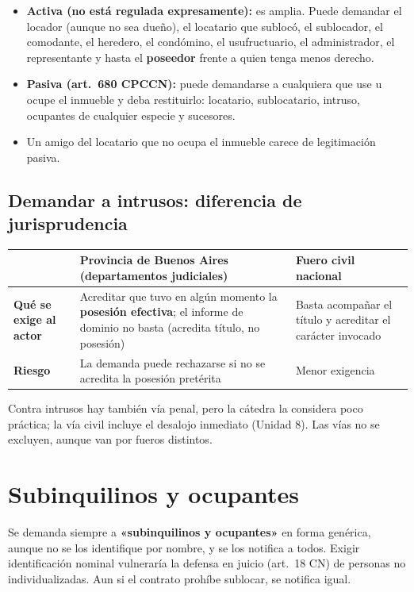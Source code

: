 \begin{itemize}
  \item \textbf{Activa (no está regulada expresamente):} es amplia. Puede demandar el locador (aunque no sea dueño), el locatario que sublocó, el sublocador, el comodante, el heredero, el condómino, el usufructuario, el administrador, el representante y hasta el \textbf{poseedor} frente a quien tenga menos derecho.
  \item \textbf{Pasiva (art.\ 680 CPCCN):} puede demandarse a cualquiera que use u ocupe el inmueble y deba restituirlo: locatario, sublocatario, intruso, ocupantes de cualquier especie y sucesores.
  \item Un amigo del locatario que no ocupa el inmueble carece de legitimación pasiva.
\end{itemize}

\subsection*{Demandar a intrusos: diferencia de jurisprudencia}

\begin{center}
\begin{tabularx}{\textwidth}{>{\raggedright\arraybackslash}p{2.6cm} Y Y}
\toprule
 & \textbf{Provincia de Buenos Aires (departamentos judiciales)} & \textbf{Fuero civil nacional} \\
\midrule
\textbf{Qué se exige al actor} & Acreditar que tuvo en algún momento la \textbf{posesión efectiva}; el informe de dominio no basta (acredita título, no posesión) & Basta acompañar el título y acreditar el carácter invocado \\
\addlinespace
\textbf{Riesgo} & La demanda puede rechazarse si no se acredita la posesión pretérita & Menor exigencia \\
\bottomrule
\end{tabularx}
\end{center}

Contra intrusos hay también vía penal, pero la cátedra la considera poco práctica; la vía civil incluye el desalojo inmediato (Unidad 8). Las vías no se excluyen, aunque van por fueros distintos.

\section{Subinquilinos y ocupantes}

Se demanda siempre a \textbf{«subinquilinos y ocupantes»} en forma genérica, aunque no se los identifique por nombre, y se los notifica a todos. Exigir identificación nominal vulneraría la defensa en juicio (art.\ 18 CN) de personas no individualizadas. Aun si el contrato prohíbe sublocar, se notifica igual.

